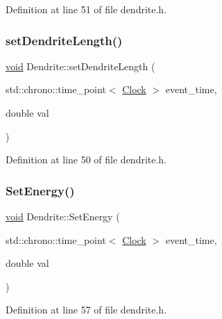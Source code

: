 Definition at line 51 of file dendrite.\+h.

\mbox{\label{class_dendrite_a9bc84d369ac487b095ed1641f89469d2}} 
\subsubsection{\texorpdfstring{set\+Dendrite\+Length()}{setDendriteLength()}}
{\footnotesize\ttfamily \mbox{\hyperlink{glad_8h_a950fc91edb4504f62f1c577bf4727c29}{void}} Dendrite\+::set\+Dendrite\+Length (\begin{DoxyParamCaption}\item[{std\+::chrono\+::time\+\_\+point$<$ \mbox{\hyperlink{universe_8h_a0ef8d951d1ca5ab3cfaf7ab4c7a6fd80}{Clock}} $>$}]{event\+\_\+time,  }\item[{double}]{val }\end{DoxyParamCaption})\hspace{0.3cm}{\ttfamily [inline]}}



Definition at line 50 of file dendrite.\+h.

\mbox{\label{class_dendrite_ad341dcd42c9d5d486be1e8268d8bca27}} 
\subsubsection{\texorpdfstring{Set\+Energy()}{SetEnergy()}}
{\footnotesize\ttfamily \mbox{\hyperlink{glad_8h_a950fc91edb4504f62f1c577bf4727c29}{void}} Dendrite\+::\+Set\+Energy (\begin{DoxyParamCaption}\item[{std\+::chrono\+::time\+\_\+point$<$ \mbox{\hyperlink{universe_8h_a0ef8d951d1ca5ab3cfaf7ab4c7a6fd80}{Clock}} $>$}]{event\+\_\+time,  }\item[{double}]{val }\end{DoxyParamCaption})\hspace{0.3cm}{\ttfamily [inline]}}



Definition at line 57 of file dendrite.\+h.

\mbox{\label{class_dendrite_ac79018e356cec31be05518b85c73a54d}} 
